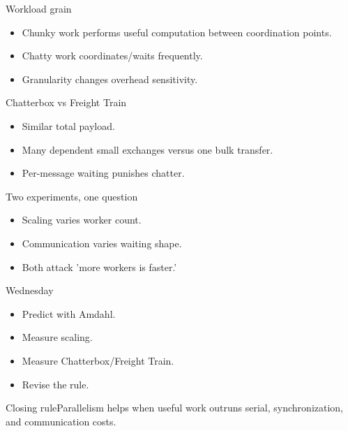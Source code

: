 \documentclass{beamer}
\begin{document}
\begin{frame}{Workload grain}\begin{itemize}\item Chunky work performs useful computation between coordination points.\item Chatty work coordinates/waits frequently.\item Granularity changes overhead sensitivity.\end{itemize}\end{frame}
\begin{frame}{Chatterbox vs Freight Train}\begin{itemize}\item Similar total payload.\item Many dependent small exchanges versus one bulk transfer.\item Per-message waiting punishes chatter.\end{itemize}\end{frame}
\begin{frame}{Two experiments, one question}\begin{itemize}\item Scaling varies worker count.\item Communication varies waiting shape.\item Both attack 'more workers is faster.'\end{itemize}\end{frame}
\begin{frame}{Wednesday}\begin{itemize}\item Predict with Amdahl.\item Measure scaling.\item Measure Chatterbox/Freight Train.\item Revise the rule.\end{itemize}\end{frame}
\begin{frame}{Closing rule}\centering\Large Parallelism helps when useful work outruns serial, synchronization, and communication costs.\end{frame}
\end{document}
